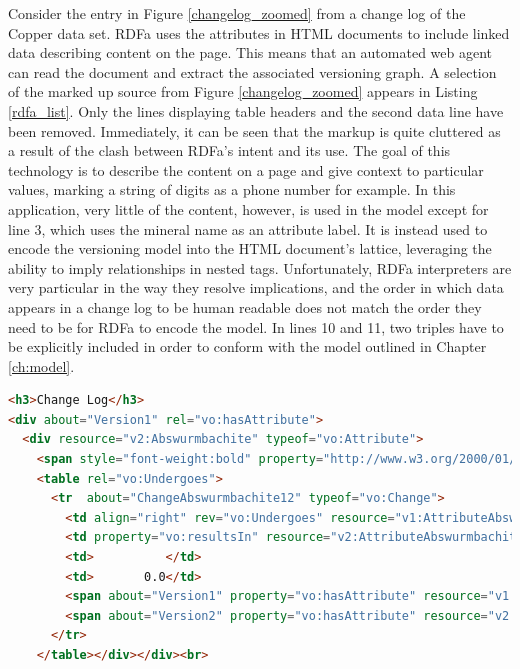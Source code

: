 Consider the entry in Figure \ref{changelog_zoomed} from a change log of the Copper data set.
RDFa uses the attributes in HTML documents to include linked data describing content on the page.
This means that an automated web agent can read the document and extract the associated versioning graph.
A selection of the marked up source from Figure \ref{changelog_zoomed} appears in Listing \ref{rdfa_list}.
Only the lines displaying table headers and the second data line have been removed.
Immediately, it can be seen that the markup is quite cluttered as a result of the clash between RDFa's intent and its use.
The goal of this technology is to describe the content on a page and give context to particular values, marking a string of digits as a phone number for example.
In this application, very little of the content, however, is used in the model except for line 3, which uses the mineral name as an attribute label.
It is instead used to encode the versioning model into the HTML document's lattice, leveraging the ability to imply relationships in nested tags.
Unfortunately, RDFa interpreters are very particular in the way they resolve implications, and the order in which data appears in a change log to be human readable does not match the order they need to be for RDFa to encode the model.
In lines 10 and 11, two triples have to be explicitly included in order to conform with the model outlined in Chapter \ref{ch:model}.

\begin{lstlisting}[language=HTML, caption=Abswurmbachite RDFa, label=rdfa_list]
<h3>Change Log</h3>
<div about="Version1" rel="vo:hasAttribute">
  <div resource="v2:Abswurmbachite" typeof="vo:Attribute">
    <span style="font-weight:bold" property="http://www.w3.org/2000/01/rdf-schema#label">Abswurmbachite</span>
    <table rel="vo:Undergoes">
      <tr  about="ChangeAbswurmbachite12" typeof="vo:Change">
        <td align="right" rev="vo:Undergoes" resource="v1:AttributeAbswurmbachite12v1" typeof="vo:Attribute"> 9</td>
        <td property="vo:resultsIn" resource="v2:AttributeAbswurmbachite12v2" typeof="vo:Attribute">(12)</td>
        <td>          </td>
        <td>       0.0</td>
        <span about="Version1" property="vo:hasAttribute" resource="v1:AttributeAbswurmbachite12v1"></span>
        <span about="Version2" property="vo:hasAttribute" resource="v2:AttributeAbswurmbachite12v2"></span>
      </tr>
    </table></div></div><br>
\end{lstlisting}


